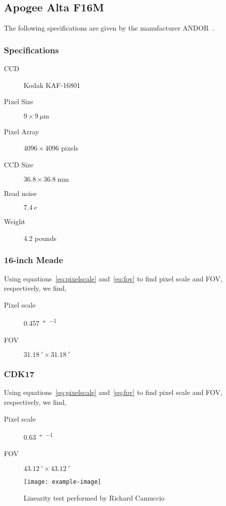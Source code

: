 \subsection{Apogee Alta F16M}
The following specifications are given by the manufacturer ANDOR~\cite{apogee}.
\subsubsection{Specifications}
\begin{description}
    \item[CCD] Kodak KAF-16801
    \item[Pixel Size] $9 \times \SI{9}{\micro\meter}$
    \item[Pixel Array] $4096 \times 4096$ pixels
    \item[CCD Size] $36.8 \times \SI{36.8}{\milli\meter}$
    \item[Read noise] $\SI{7.4}{\elementarycharge}$
    \item[Weight] 4.2 pounds
\end{description}


\subsubsection{16-inch Meade}
Using equations~\ref{eq:pixelscale} and~\ref{eq:fov} to find pixel scale and FOV, respectively, we find, 
\begin{description}
    \item[Pixel scale] \SI{0.457}{\arcsecond\per{}}
    \item[FOV] $\SI{31.18}{\arcminute} \times \SI{31.18}{\arcminute}$
\end{description}

\subsubsection{CDK17}
Using equations~\ref{eq:pixelscale} and~\ref{eq:fov} to find pixel scale and FOV, respectively, we find, 
\begin{description}
    \item[Pixel scale] \SI{0.63}{\arcsecond\per{}}
    \item[FOV] $\SI{43.12}{\arcminute} \times \SI{43.12}{\arcminute}$
\end{description}

\begin{figure}[h]
    \centering
    \texttt{[image: example-image]}
    \caption{Linearity test performed by Richard Camuccio~\protect\cite{richard_2019a}}
\label{fig:linearity}
\end{figure}

